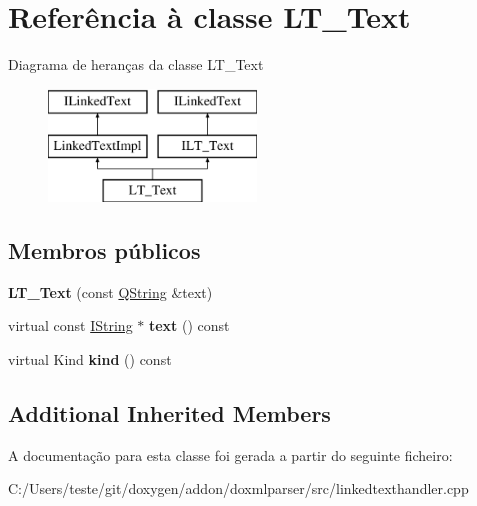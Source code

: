 \hypertarget{class_l_t___text}{\section{Referência à classe L\-T\-\_\-\-Text}
\label{class_l_t___text}
}
Diagrama de heranças da classe L\-T\-\_\-\-Text\begin{figure}[H]
\begin{center}
\leavevmode
\includegraphics[height=3.000000cm]{class_l_t___text}
\end{center}
\end{figure}
\subsection*{Membros públicos}
\begin{DoxyCompactItemize}
\item 
\hypertarget{class_l_t___text_add2b685db1079f60a258b952a505b810}{{\bfseries L\-T\-\_\-\-Text} (const \hyperlink{class_q_string}{Q\-String} \&text)}\label{class_l_t___text_add2b685db1079f60a258b952a505b810}

\item 
\hypertarget{class_l_t___text_a38ed11cab67ca9bf8d04302e53b86a69}{virtual const \hyperlink{class_i_string}{I\-String} $\ast$ {\bfseries text} () const }\label{class_l_t___text_a38ed11cab67ca9bf8d04302e53b86a69}

\item 
\hypertarget{class_l_t___text_af8e62c8a81ddf2283205cc8955de50eb}{virtual Kind {\bfseries kind} () const }\label{class_l_t___text_af8e62c8a81ddf2283205cc8955de50eb}

\end{DoxyCompactItemize}
\subsection*{Additional Inherited Members}


A documentação para esta classe foi gerada a partir do seguinte ficheiro\-:\begin{DoxyCompactItemize}
\item 
C\-:/\-Users/teste/git/doxygen/addon/doxmlparser/src/linkedtexthandler.\-cpp\end{DoxyCompactItemize}
